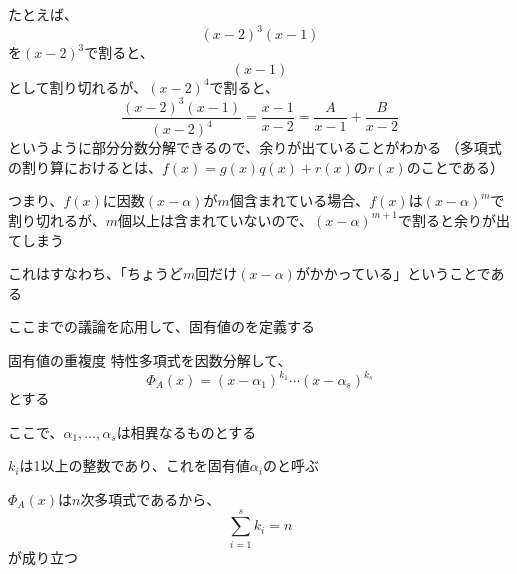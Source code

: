 \documentclass[../../../topic_linear-algebra]{subfiles}
\begin{document}
\br

たとえば、
\begin{equation*}
  (x-2)^3 (x-1)
\end{equation*}
を$(x-2)^3$で割ると、
\begin{equation*}
  (x - 1)
\end{equation*}
として割り切れるが、$(x-2)^4$で割ると、
\begin{equation*}
  \frac{(x-2)^3 (x-1)}{(x-2)^4} = \frac{x-1}{x-2} = \frac{A}{x-1} + \frac{B}{x-2}
\end{equation*}
というように部分分数分解できるので、余りが出ていることがわかる
（多項式の割り算におけるとは、$f(x) = g(x)q(x) + r(x)$の$r(x)$のことである）

\br

つまり、$f(x)$に因数$(x-\alpha)$が$m$個含まれている場合、$f(x)$は$(x-\alpha)^m$で割り切れるが、$m$個以上は含まれていないので、$(x-\alpha)^{m+1}$で割ると余りが出てしまう

これはすなわち、「ちょうど$m$回だけ$(x-\alpha)$がかかっている」ということである

\sectionline

ここまでの議論を応用して、固有値のを定義する

\begin{definition}{固有値の重複度}
  特性多項式を因数分解して、
  \begin{equation*}
    \Phi_A(x) = (x- \alpha_1)^{k_1}\cdots (x - \alpha_s)^{k_s}
  \end{equation*}
  とする

  ここで、$\alpha_1,\ldots, \alpha_s$は相異なるものとする

  $k_i$は1以上の整数であり、これを固有値$\alpha_i$のと呼ぶ

  $\Phi_A(x)$は$n$次多項式であるから、
  \begin{equation*}
    \sum_{i=1}^s k_i = n
  \end{equation*}
  が成り立つ
\end{definition}
\end{document}
